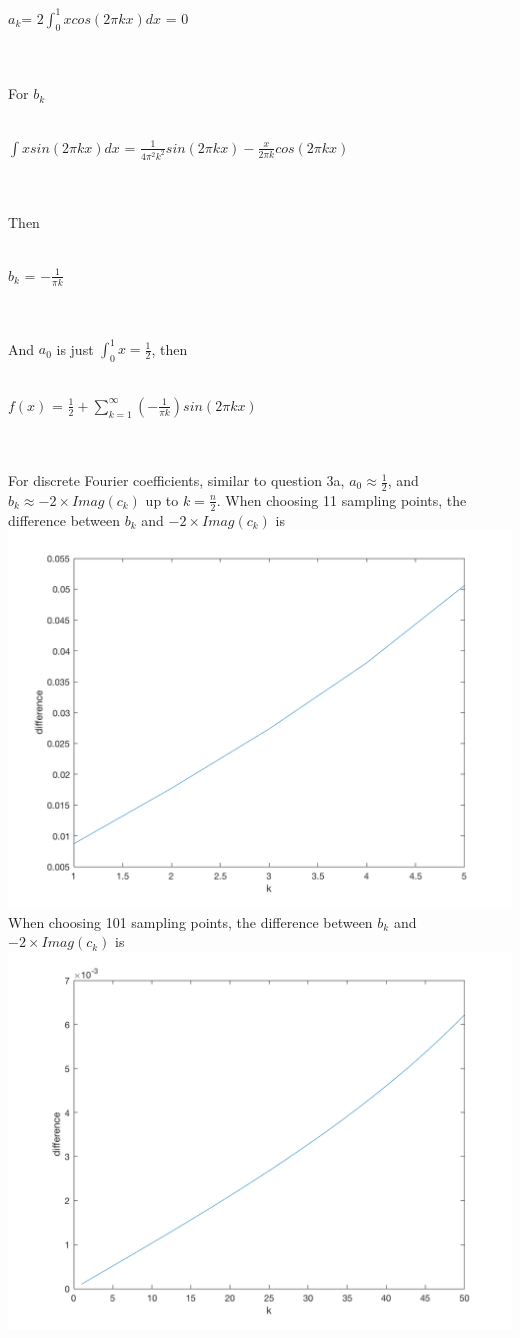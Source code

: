 \documentclass[11pt]{article} %
\begin{document}
\centerline{$a_k$= $2\int_{0}^{1}xcos(2\pi k x)dx$ = $0$}\\\\
For $b_{k}$\\\\
\centerline{$\int xsin(2\pi k x)dx$ = $\frac{1}{4\pi^2 k^2}sin(2\pi k x) - \frac{x}{2\pi k}cos(2\pi k x)$}\\\\
Then\\\\
\centerline{$b_{k}$ = $-\frac{1}{\pi k}$}\\\\
And $a_{0}$ is just $\int_{0}^{1}x = \frac{1}{2}$, then\\\\
\centerline{$f(x)$ = $\frac{1}{2}+\sum_{k=1}^{\infty}(-\frac{1}{\pi k})sin(2\pi k x)$}\\\\
For discrete Fourier coefficients, similar to question 3a, $a_{0}\approx \frac{1}{2}$, and $b_{k}\approx -2\times Imag(c_{k})$ up to $k = \frac{n}{2}$.
When choosing 11 sampling points, the difference between $b_{k}$ and $-2\times Imag(c_{k})$ is\\ 
\includegraphics[scale=0.4]{e321.png}
When choosing 101 sampling points, the difference between $b_{k}$ and $-2\times Imag(c_{k})$ is\\ 
\includegraphics[scale=0.4]{e322.png}
\end{document}
